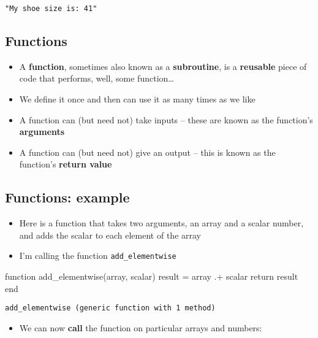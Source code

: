 \documentclass[
  letterpaper,
  DIV=11,
  numbers=noendperiod]{scrartcl}
\newenvironment{Shaded}{\begin{snugshade}}{\end{snugshade}}
\newcommand{\ControlFlowTok}[1]{\textcolor[rgb]{0.00,0.23,0.31}{#1}}
\newcommand{\FunctionTok}[1]{\textcolor[rgb]{0.28,0.35,0.67}{#1}}
\newcommand{\KeywordTok}[1]{\textcolor[rgb]{0.00,0.23,0.31}{#1}}
\newcommand{\NormalTok}[1]{\textcolor[rgb]{0.00,0.23,0.31}{#1}}
\newcommand{\OperatorTok}[1]{\textcolor[rgb]{0.37,0.37,0.37}{#1}}
\providecommand{\tightlist}{%
  \setlength{\itemsep}{0pt}\setlength{\parskip}{0pt}}\usepackage{longtable,booktabs,array}
\begin{document}
\begin{verbatim}
"My shoe size is: 41"
\end{verbatim}

\subsection{Functions}\label{functions}

\begin{itemize}
\tightlist
\item
  A \textbf{function}, sometimes also known as a \textbf{subroutine}, is
  a \textbf{reusable} piece of code that performs, well, some
  function\ldots{}
\item
  We define it once and then can use it as many times as we like
\item
  A function can (but need not) take inputs -- these are known as the
  function's \textbf{arguments}
\item
  A function can (but need not) give an output -- this is known as the
  function's \textbf{return value}
\end{itemize}

\subsection{Functions: example}\label{functions-example}

\begin{itemize}
\tightlist
\item
  Here is a function that takes two arguments, an array and a scalar
  number, and adds the scalar to each element of the array
\item
  I'm calling the function \texttt{add\_elementwise}
\end{itemize}

\begin{Shaded}
\begin{Highlighting}[]
\KeywordTok{function} \FunctionTok{add\_elementwise}\NormalTok{(array, scalar)}
\NormalTok{  result }\OperatorTok{=}\NormalTok{ array }\OperatorTok{.+}\NormalTok{ scalar}
  \ControlFlowTok{return}\NormalTok{ result}
\KeywordTok{end}
\end{Highlighting}
\end{Shaded}

\begin{verbatim}
add_elementwise (generic function with 1 method)
\end{verbatim}

\begin{itemize}
\tightlist
\item
  We can now \textbf{call} the function on particular arrays and
  numbers:
\end{itemize}
\end{document}
